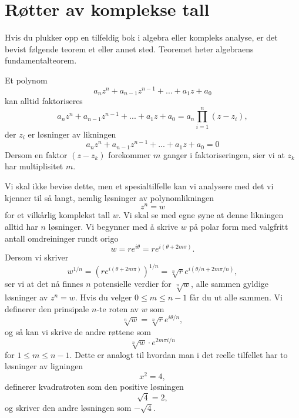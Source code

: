 \section*{Røtter av komplekse tall}
Hvis du plukker opp en tilfeldig bok i algebra eller kompleks analyse, 
er det bevist følgende teorem et eller annet sted. 
Teoremet heter algebraens fundamentalteorem.
\begin{thm}
Et polynom
\[
a_nz^n+a_{n-1}z^{n-1}+...+a_1z+a_0
\]
kan alltid faktoriseres
\[
a_nz^n+a_{n-1}z^{n-1}+...+a_1z+a_0=a_n \prod_{i=1}^n (z-z_i),
\]
der $z_i$ er løsninger av likningen
\[
a_nz^n+a_{n-1}z^{n-1}+...+a_1z+a_0=0
\]
Dersom en faktor $(z-z_k)$  forekommer $m$ ganger i faktoriseringen, 
sier vi at $z_k$ har multiplisitet $m$.
\end{thm}
Vi skal ikke bevise dette,
men et spesialtilfelle kan vi analysere med det vi kjenner til så langt, 
nemlig løsninger av polynomlikningen
\[
z^n=w
\]
for et vilkårlig komplekst tall $w$. 
Vi skal se med egne øyne at denne likningen alltid har $n$ løsninger. 
Vi begynner med å skrive $w$ på polar form med valgfritt antall omdreininger rundt origo
\[
w = re^{i \theta}=re^{i (\theta+2m\pi)}.
\]
Dersom vi skriver 
\[
w^{1/n} = (re^{i (\theta+2m\pi)})^{1/n}=\sqrt[n]{r}e^{i (\theta/n+2m\pi/n)},
\]
ser vi at det nå finnes $n$ potensielle verdier for $\sqrt[n]{w}$, alle sammen gyldige løsninger av $z^n=w$. 
Hvis du velger $0\leq m \leq n-1$ får du ut alle sammen. 
Vi definerer den prinsipale $n$-te roten av $w$ som
\[
\sqrt[n]{w} = \sqrt[n]{r}e^{i \theta/n},
\]
og så kan vi skrive de andre røttene som 
\[
\sqrt[n]{w} \cdot e^{2m\pi i/n}
\]
for $1 \leq m\leq n-1$.
Dette er analogt til hvordan man i det reelle tilfellet har to løsninger av ligningen
\[
x^2=4,
\]
definerer kvadratroten som den positive løsningen
\[
\sqrt{4}=2,
\]
og skriver den andre løsningen som $-\sqrt{4}$.


